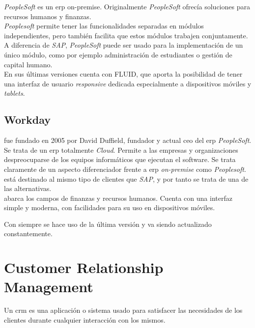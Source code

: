 \textit{PeopleSoft} es un \acrshort{erp} \gls{on-premise}.
Originalmente \textit{PeopleSoft} ofrecía soluciones para recursos humanos y finanzas.\\

\textit{Peoplesoft} permite tener las funcionalidades separadas en módulos independientes, pero también facilita que estos módulos trabajen conjuntamente.
A diferencia de \textit{SAP}, \textit{PeopleSoft} puede ser usado para la implementación de un único módulo, como por ejemplo administración de estudiantes o gestión de capital humano.\\

En sus últimas versiones cuenta con FLUID, que aporta la posibilidad de tener una interfaz de usuario \textit{responsive} dedicada especialmente a dispositivos móviles y \textit{tablets}.

\cite{anderson_2001}

\subsection{Workday}
\wday{} fue fundado en 2005 por David Duffield, fundador y actual \acrshort{ceo} del \acrshort{erp} \textit{PeopleSoft}.\\



Se trata de un \acrshort{erp} totalmente \textit{Cloud}. Permite a las empresas y organizaciones despreocuparse de los equipos informáticos que ejecutan el software. Se trata claramente de un aspecto diferenciador frente a \acrshort{erp} \textit{on-premise} como \textit{Peoplesoft}. 
\wday{} está destinado al mismo tipo de clientes que \textit{SAP}, y por tanto se trata de una de las alternativas.\\


\wday{} abarca los campos de finanzas y recursos humanos. Cuenta con una interfaz simple y moderna, con facilidades para su uso en dispositivos móviles.

Con \wday{} siempre se hace uso de la última versión y va siendo actualizado constantemente.


\section{Customer Relationship Management}

Un \acrfull{crm} es una aplicación o sistema usado para satisfacer las necesidades de los clientes durante cualquier interacción con los mismos.

